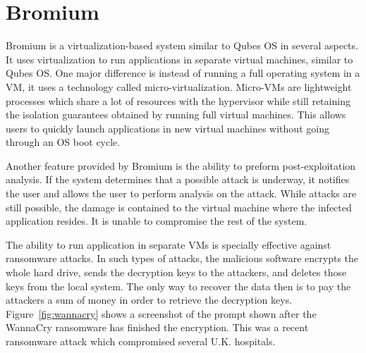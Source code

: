 \section{Bromium}

Bromium \cite{bromium} is a virtualization-based system similar to Qubes OS in several aspects. It uses virtualization to run applications in separate virtual machines, similar to Qubes OS. One major difference is instead of running a full operating system in a VM, it uses a technology called micro-virtualization. Micro-VMs are lightweight processes which share a lot of resources with the hypervisor while still retaining the isolation guarantees obtained by running full virtual machines. This allows users to quickly launch applications in new virtual machines without going through an OS boot cycle.

Another feature provided by Bromium is the ability to preform post-exploitation analysis. If the system determines that a possible attack is underway, it notifies the user and allows the user to perform analysis on the attack. While attacks are still possible, the damage is contained to the virtual machine where the infected application resides. It is unable to compromise the rest of the system.

The ability to run application in separate VMs is specially effective against ransomware attacks. In such types of attacks, the malicious software encrypts the whole hard drive, sends the decryption keys to the attackers, and deletes those keys from the local system. The only way to recover the data then is to pay the attackers a sum of money in order to retrieve the decryption keys. Figure~\ref{fig:wannacry} shows a screenshot of the prompt shown after the WannaCry ransomware has finished the encryption. This was a recent ransomware attack which compromised several U.K. hospitals.

